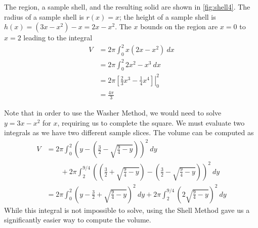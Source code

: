 {The region, a sample shell, and the resulting solid are shown in \autoref{fig:shell4}. The radius of a sample shell is $r(x)=x$; the height of a sample shell is $h(x)=(3x-x^2)-x=2x-x^2$. The $x$ bounds on the region are $x=0$ to $x=2$ leading to the integral
\begin{align*}
V&=2\pi \int_0^2 x(2x-x^2) ~dx\\
&=2\pi \int_0^2 2x^2-x^3 ~dx\\
&=2\pi \left.\left[ \frac23 x^3-\frac14 x^4 \right] \right|_0^2\\
&=\frac{4\pi}{3}
\end{align*}

Note that in order to use the Washer Method, we would need to solve $y=3x-x^2$ for $x$, requiring us to complete the square. We must evaluate two integrals as we have two different sample slices. The volume can be computed as 
\begin{align*}
V&=2\pi \int_0^{2} \left(y-\left(\frac32-\sqrt{\frac94 -y}\right)\right)^2~dy \\
&\qquad + 2\pi \int_2^{9/4} \left(\left(\frac32+\sqrt{\frac94 -y}\right)-\left(\frac32-\sqrt{\frac94 -y}\right)\right)^2~dy\\
&=2\pi \int_0^2 \left(y-\frac32 +\sqrt{\frac94 -y}\right)^2 ~dy + 2\pi\int_2^{9/4} \left(2\sqrt{\frac94 -y}\right)^2~dy
\end{align*}
While this integral is not impossible to solve, using the Shell Method gave us a significantly easier way to compute the volume.}

%

